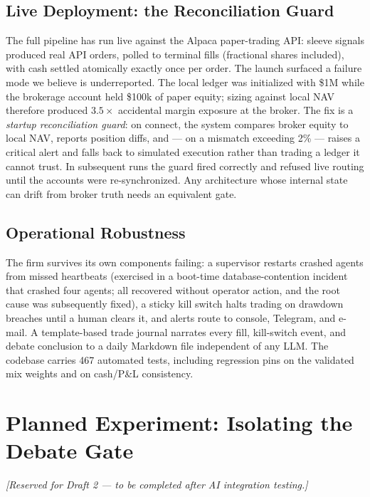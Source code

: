 \documentclass[10pt,twocolumn]{IEEEtran}
\begin{document}
\subsection{Live Deployment: the Reconciliation Guard}
\label{sec:live}

The full pipeline has run live against the Alpaca paper-trading API:
sleeve signals produced real API orders, polled to terminal fills
(fractional shares included), with cash settled atomically exactly once per
order. The launch surfaced a failure mode we believe is underreported. The
local ledger was initialized with \$1M while the brokerage account held
\$100k of paper equity; sizing against local NAV therefore produced
$3.5\times$ accidental margin exposure at the broker. The fix is a
\emph{startup reconciliation guard}: on connect, the system compares
broker equity to local NAV, reports position diffs, and --- on a mismatch
exceeding 2\% --- raises a critical alert and falls back to simulated
execution rather than trading a ledger it cannot trust. In subsequent runs
the guard fired correctly and refused live routing until the accounts were
re-synchronized. Any architecture whose internal state can drift from
broker truth needs an equivalent gate.

\subsection{Operational Robustness}

The firm survives its own components failing: a supervisor restarts crashed
agents from missed heartbeats (exercised in a boot-time database-contention
incident that crashed four agents; all recovered without operator action,
and the root cause was subsequently fixed), a sticky kill switch halts
trading on drawdown breaches until a human clears it, and alerts route to
console, Telegram, and e-mail. A template-based trade journal narrates every
fill, kill-switch event, and debate conclusion to a daily Markdown file
independent of any LLM. The codebase carries 467 automated tests, including
regression pins on the validated mix weights and on cash/P\&L consistency.

\section{Planned Experiment: Isolating the Debate Gate}
\label{sec:aitest}

\emph{[Reserved for Draft 2 --- to be completed after AI integration testing.]}
\end{document}
